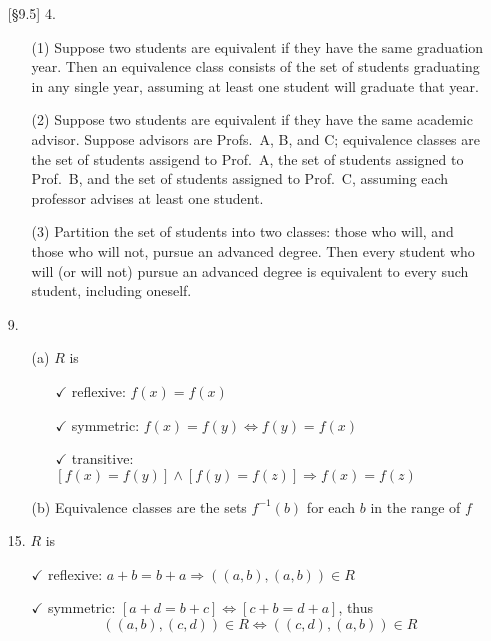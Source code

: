 \documentclass{article}
\begin{document}
\begin{enumerate}
    \item[{[\S 9.5]} 4.]
        \begin{itemize}
            \item[(1)] Suppose two students are equivalent if they have the same graduation year. Then an equivalence class consists of the set of students graduating in any single year, assuming at least one student will graduate that year.
            \item[(2)] Suppose two students are equivalent if they have the same academic advisor. Suppose advisors are Profs.~A, B, and C; equivalence classes are the set of students assigend to Prof.~A, the set of students assigned to Prof.~B, and the set of students assigned to Prof.~C, assuming each professor advises at least one student.
            \item[(3)] Partition the set of students into two classes: those who will, and those who will not, pursue an advanced degree. Then every student who will (or will not) pursue an advanced degree is equivalent to every such student, including oneself.
        \end{itemize}
    \item[9.]
        \begin{itemize}
            \item[(a)] $R$ is
                \begin{itemize}
                    \item[$\checkmark$] reflexive: $f(x) = f(x)$
                    \item[$\checkmark$] symmetric: $f(x) = f(y) \Leftrightarrow f(y) = f(x)$
                    \item[$\checkmark$] transitive: $[f(x)=f(y)] \land [f(y)=f(z)] \Rightarrow f(x)=f(z)$
                \end{itemize}
            \item[(b)] Equivalence classes are the sets $f^{-1}(b)$ for each $b$ in the range of $f$
        \end{itemize}
    \item[15.] $R$ is
        \begin{itemize}
            \item[$\checkmark$] reflexive: $a+b = b+a \Rightarrow ((a,b), (a,b)) \in R$
            \item[$\checkmark$] symmetric: $[a+d = b+c] \Leftrightarrow [c+b = d+a]$, thus
            \[
            ((a,b), (c,d)) \in R \Leftrightarrow ((c,d),(a,b)) \in R
\]
\end{itemize}
\end{enumerate}
\end{document}
